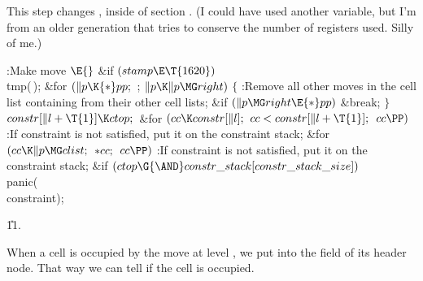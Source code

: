 This step changes , inside of section .
(I could have used another variable, but I'm from an older generation
that tries to conserve the number of registers used. Silly of me.)

\Y\B\4:Make move \X${}\E{}$\6
\&{if} ${}(\\{stamp}\E\T{1620}){}$\1\5
\\{tmp}(\,);\2\6
\&{for} ${}(\|p\K{*}\\{pp};{}$  ; ${}\|p\K\|p\MG\\{right}){}$\5
${}\{{}$\1\6
:Remove all other moves in the cell list containing  from their
other cell lists\X;\6
\&{if} ${}(\|p\MG\\{right}\E{*}\\{pp}){}$\1\5
\&{break};\2\6
\4${}\}{}$\2\6
${}\\{constr}[\|l+\T{1}]\K\\{ctop};{}$\6
\&{for} ${}(\\{cc}\K\\{constr}[\|l];{}$ ${}\\{cc}<\\{constr}[\|l+\T{1}];{}$ ${}%
\\{cc}\PP){}$\1\5
:If constraint  is not satisfied, put it on the
constraint stack\X;\2\6
\&{for} ${}(\\{cc}\K\|p\MG\\{clist};{}$ ${}{*}\\{cc};{}$ ${}\\{cc}\PP){}$\1\5
:If constraint  is not satisfied, put it on the
constraint stack\X;\2\6
\&{if} ${}(\\{ctop}\G{\AND}\\{constr\_stack}[\\{constr\_stack\_size}]){}$\1\5
\\{panic}(\\{constraint});\2\par
\U11.\fi

When a cell is occupied by the move at level ,
we put  into
the  field of its header node. That way we can tell if the
cell is occupied.

